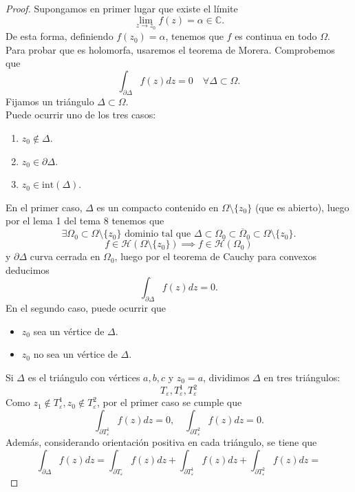 \begin{proof}
    Supongamos en primer lugar que existe el límite
    \[
        \lim_{z \to z_0} f(z) = \alpha \in \mathbb{C}.
    \]
    De esta forma, definiendo $f(z_0) = \alpha$, tenemos que $f$ es continua en todo $\Omega$.\\
    Para probar que es holomorfa, usaremos el teorema de Morera. Comprobemos que 
    \[
        \int_{\partial \Delta} f(z) dz = 0 \quad \forall \Delta \subset \Omega. 
    \]
    Fijamos un triángulo $\Delta \subset \Omega$.\\
    Puede ocurrir uno de los tres casos:
    \begin{enumerate}
        \item $z_0 \notin \Delta$. 
        \item $z_0 \in \partial \Delta$.
        \item $z_0 \in \text{int}(\Delta)$.
    \end{enumerate}
    En el primer caso, $\Delta$ es un compacto contenido en $\Omega \setminus \{ z_0 \}$ (que es abierto), luego por el lema 1 del tema 8 tenemos que
    \[
        \exists \Omega_0 \subset \Omega \setminus \{ z_0 \} \text{ dominio tal que } \Delta \subset \Omega_0 \subset \overline{\Omega}_0 \subset \Omega \setminus \{ z_0 \}.
    \]
    \[
        f \in \mathcal{H}(\Omega \setminus \{ z_0 \}) \implies f \in \mathcal{H}(\Omega_0)
    \]
    y $\partial \Delta$ curva cerrada en $\Omega_0$, luego por el teorema de Cauchy para convexos deducimos
    \[
        \int_{\partial \Delta} f(z) dz = 0.
    \]
    En el segundo caso, puede ocurrir que 
    \begin{itemize}
        \item $z_0$ sea un vértice de $\Delta$.
        \item $z_0$ no sea un vértice de $\Delta$.
    \end{itemize}
    Si $\Delta$ es el triángulo con vértices $a, b, c$ y $z_0 = a$, dividimos $\Delta$ en tres triángulos:
    \[
        T_{\varepsilon}, T^1_{\varepsilon}, T^2_{\varepsilon}
    \]
    Como $z_1 \notin T^1_{\varepsilon}, z_0 \notin T^2_{\varepsilon}$, por el primer caso se cumple que
    \[
        \int_{\partial T^1_{\varepsilon}} f(z) dz = 0, \quad \int_{\partial T^2_{\varepsilon}} f(z) dz = 0.
    \]
    Además, considerando orientación positiva en cada triángulo, se tiene que
    \[
        \int_{\partial \Delta} f(z) dz =
        \int_{\partial T_{\varepsilon}} f(z) dz +
        \int_{\partial T^1_{\varepsilon}} f(z) dz +
        \int_{\partial T^2_{\varepsilon}} f(z) dz =
\]
\end{proof}
